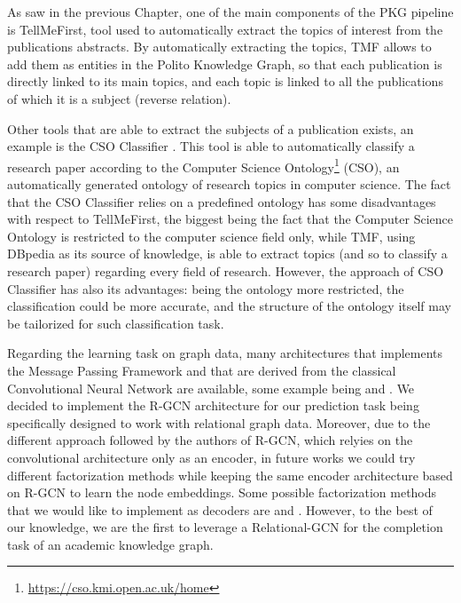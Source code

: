 \documentclass[%
    corpo=13.5pt,
    twoside,
    oldstyle,
    tipotesi=magistrale,
    greek,
    evenboxes
]{toptesi}
\begin{document}
As saw in the previous Chapter, one of the main components of the PKG
pipeline is TellMeFirst, tool used to automatically extract the topics of
interest from the publications abstracts. By automatically extracting the
topics, TMF allows to add them as entities in the Polito Knowledge Graph,
so that each publication is directly linked to its main topics, and each topic
is linked to all the publications of which it is a subject (reverse relation).

Other tools that are able to extract the subjects of a publication exists, an
example is the CSO Classifier \cite{salatino2019}. This tool is able to
automatically classify a research paper according to the Computer Science
Ontology\footnote{\url{https://cso.kmi.open.ac.uk/home}} (CSO), an automatically
generated ontology of research topics in computer science.
The fact that the CSO Classifier relies on a predefined ontology has some
disadvantages with respect to TellMeFirst, the biggest being the fact that the
Computer Science Ontology is restricted to the computer science field only,
while TMF, using DBpedia as its source of knowledge, is able to extract
topics (and so to classify a research paper) regarding every field of research.
However, the approach of CSO Classifier has also its advantages: being the
ontology more restricted, the classification could be more accurate, and the
structure of the ontology itself may be tailorized for such classification task.

Regarding the learning task on graph data, many architectures that implements
the Message Passing Framework\cite{gilmer2017} and that are derived from the
classical Convolutional Neural Network are available, some example being
\cite{defferrard2016} and \cite{duvenaud2015}.
We decided to implement the R-GCN architecture for our prediction task
being specifically designed to work with relational graph data.
Moreover, due to the different approach followed by the authors of R-GCN, which
relyies on the convolutional architecture only as an encoder, in future works
we could try different factorization methods while keeping the same encoder
architecture based on R-GCN to learn the node embeddings.
Some possible factorization methods that we would like to implement
as decoders are \cite{kazemi2018} and \cite{trouillon2016}.
However, to the best of our knowledge, we are the first to leverage a
Relational-GCN for the completion task of an academic knowledge graph.
\end{document}
